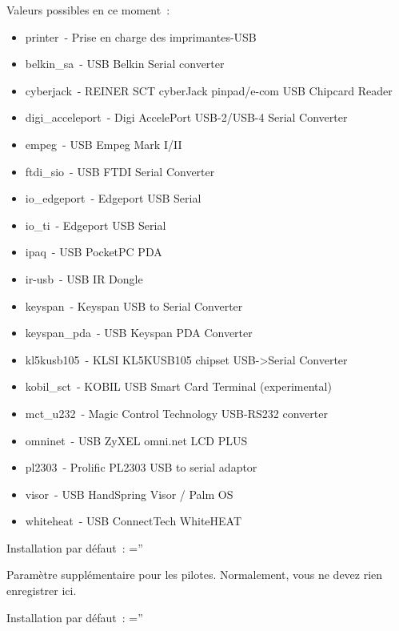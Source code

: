 \begin{description}
        Valeurs possibles en ce moment~:
        \begin{itemize}
	    \item printer~- Prise en charge des imprimantes-USB
	    \item belkin\_sa~- USB Belkin Serial converter
	    \item cyberjack~- REINER SCT cyberJack pinpad/e-com USB Chipcard Reader
	    \item digi\_acceleport~- Digi AccelePort USB-2/USB-4 Serial Converter
	    \item empeg~- USB Empeg Mark I/II
	    \item ftdi\_sio~- USB FTDI Serial Converter
	    \item io\_edgeport~- Edgeport USB Serial
	    \item io\_ti~- Edgeport USB Serial
	    \item ipaq~- USB PocketPC PDA
	    \item ir-usb~- USB IR Dongle
	    \item keyspan~- Keyspan USB to Serial Converter
	    \item keyspan\_pda~- USB Keyspan PDA Converter
	    \item kl5kusb105~- KLSI KL5KUSB105 chipset USB->Serial Converter
	    \item kobil\_sct~- KOBIL USB Smart Card Terminal (experimental)
	    \item mct\_u232~- Magic Control Technology USB-RS232 converter
	    \item omninet~- USB ZyXEL omni.net LCD PLUS
	    \item pl2303~- Prolific PL2303 USB to serial adaptor
	    \item visor~- USB HandSpring Visor / Palm OS
	    \item whiteheat~- USB ConnectTech WhiteHEAT
        \end{itemize}

        Installation par défaut~: =''


        Paramètre supplémentaire pour les pilotes. Normalement, vous ne devez
        rien enregistrer ici.

        Installation par défaut~: =''



\end{description}
